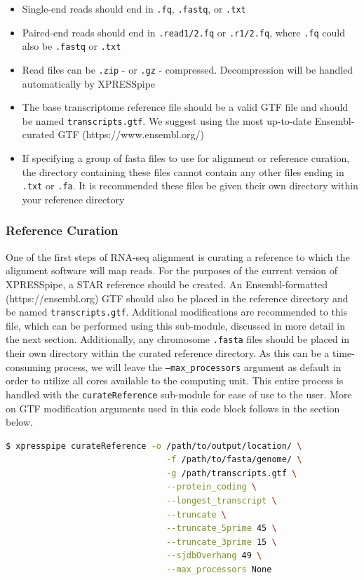\documentclass[11pt, a4paper, oneside]{article}
\begin{document}
\begin{itemize}
\item Single-end reads should end in \texttt{.fq}, \texttt{.fastq}, or \texttt{.txt}
\item Paired-end reads should end in \texttt{.read1/2.fq} or \texttt{.r1/2.fq}, where \texttt{.fq} could also be \texttt{.fastq} or \texttt{.txt}
\item Read files can be \texttt{.zip} - or \texttt{.gz} - compressed. Decompression will be handled automatically by XPRESSpipe
\item The base transcriptome reference file should be a valid GTF file and should be named \texttt{transcripts.gtf}. We suggest using the most up-to-date Ensembl-curated GTF (https://www.ensembl.org/)
\item If specifying a group of fasta files to use for alignment or reference curation, the directory containing these files cannot contain any other files ending in \texttt{.txt} or \texttt{.fa}. It is recommended these files be given their own directory within your reference directory
\end{itemize}

\subsubsection{Reference Curation}
One of the first steps of RNA-seq alignment is curating a reference to which the alignment software will map reads. For the purposes of the current version of XPRESSpipe, a STAR \cite{star} reference should be created. An Ensembl-formatted (https://ensembl.org) GTF should also be placed in the reference directory and be named \texttt{transcripts.gtf}. Additional modifications are recommended to this file, which can be performed using this sub-module, discussed in more detail in the next section. Additionally, any chromosome \texttt{.fasta} files should be placed in their own directory within the curated reference directory. As this can be a time-consuming process, we will leave the \texttt{--max\_processors} argument as default in order to utilize all cores available to the computing unit. This entire process is handled with the \texttt{curateReference} sub-module for ease of use to the user. More on GTF modification arguments used in this code block follows in the section below.
\newline
\begin{lstlisting}[language=bash, caption=curateReference example]
$ xpresspipe curateReference -o /path/to/output/location/ \
                                -f /path/to/fasta/genome/ \
                                -g /path/transcripts.gtf \
                                --protein_coding \
                                --longest_transcript \
                                --truncate \
                                --truncate_5prime 45 \
                                --truncate_3prime 15 \
                                --sjdbOverhang 49 \
                                --max_processors None
\end{lstlisting}
\end{document}
